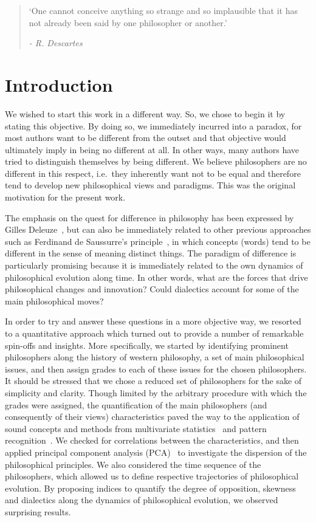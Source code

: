 \documentclass[%
 aip,
 jmp,%
 amsmath,amssymb,
 reprint,%
]{revtex4-1}
\begin{document}
\begin{quotation}
`One cannot conceive anything so strange and so implausible that it
has not already been said by one philosopher or another.'

\emph{- R. Descartes}
\end{quotation}


\section{\label{sec:level1}Introduction}

We wished to start this work in a different way. So, we chose to begin
it by stating this objective.  By doing so, we immediately incurred
into a paradox, for most authors want to be different from the outset
and that objective would ultimately imply in being no different at
all.  In other ways, many authors have tried to distinguish themselves
by being different.  We believe philosophers are no different in this
respect, i.e.\ they inherently want not to be equal and therefore tend
to develop new philosophical views and paradigms.  This was the
original motivation for the present work.

The emphasis on the quest for difference in philosophy has been
expressed by Gilles Deleuze~\cite{Deleuze}, but can also be
immediately related to other previous approaches such as Ferdinand de
Saussurre's principle~\cite{Saussure}, in which concepts (words) tend
to be different in the sense of meaning distinct things.  The paradigm
of difference is particularly promising because it is immediately
related to the own dynamics of philosophical evolution along time.  In
other words, what are the forces that drive philosophical changes and
innovation?  Could dialectics account for some of the main
philosophical moves?

In order to try and answer these questions in a more objective way, we
resorted to a quantitative approach which turned out to provide a
number of remarkable spin-offs and insights.  More specifically, we
started by identifying prominent philosophers along the history of
western philosophy, a set of main philosophical issues, and then
assign grades to each of these issues for the chosen philosophers.  It
should be stressed that we chose a reduced set of philosophers for the
sake of simplicity and clarity.  Though limited by the arbitrary
procedure with which the grades were assigned, the quantification of
the main philosophers (and consequently of their views)
characteristics paved the way to the application of sound concepts and
methods from multivariate statistics~\cite{Papoulis, Wichern,
Therrien} and pattern recognition~\cite{Duda, Costa}.  We checked for
correlations between the characteristics, and then applied principal
component analysis (PCA)~\cite{Costa} to investigate the dispersion of
the philosophical principles.  We also considered the time sequence of
the philosophers, which allowed us to define respective trajectories
of philosophical evolution.  By proposing indices to quantify the
degree of opposition, skewness and dialectics along the dynamics of
philosophical evolution, we observed surprising results.
\end{document}
